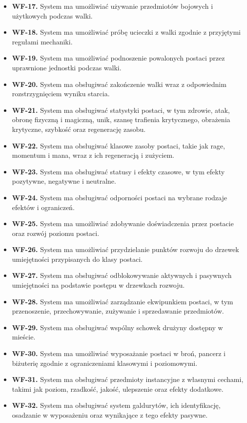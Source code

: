 \begin{itemize}
    \item \textbf{WF-17.} System ma umożliwiać używanie przedmiotów bojowych i użytkowych podczas walki.
    \item \textbf{WF-18.} System ma umożliwiać próbę ucieczki z walki zgodnie z przyjętymi regułami mechaniki.
    \item \textbf{WF-19.} System ma umożliwiać podnoszenie powalonych postaci przez uprawnione jednostki podczas walki.
    \item \textbf{WF-20.} System ma obsługiwać zakończenie walki wraz z odpowiednim rozstrzygnięciem wyniku starcia.
    \item \textbf{WF-21.} System ma obsługiwać statystyki postaci, w tym zdrowie, atak, obronę fizyczną i magiczną, unik, szansę trafienia krytycznego, obrażenia krytyczne, szybkość oraz regenerację zasobu.
    \item \textbf{WF-22.} System ma obsługiwać klasowe zasoby postaci, takie jak rage, momentum i mana, wraz z ich regeneracją i zużyciem.
    \item \textbf{WF-23.} System ma obsługiwać statusy i efekty czasowe, w tym efekty pozytywne, negatywne i neutralne.
    \item \textbf{WF-24.} System ma obsługiwać odporności postaci na wybrane rodzaje efektów i ograniczeń.
    \item \textbf{WF-25.} System ma umożliwiać zdobywanie doświadczenia przez postacie oraz rozwój poziomu postaci.
    \item \textbf{WF-26.} System ma umożliwiać przydzielanie punktów rozwoju do drzewek umiejętności przypisanych do klasy postaci.
    \item \textbf{WF-27.} System ma obsługiwać odblokowywanie aktywnych i pasywnych umiejętności na podstawie postępu w drzewkach rozwoju.
    \item \textbf{WF-28.} System ma umożliwiać zarządzanie ekwipunkiem postaci, w tym przenoszenie, przechowywanie, zużywanie i sprzedawanie przedmiotów.
    \item \textbf{WF-29.} System ma obsługiwać wspólny schowek drużyny dostępny w mieście.
    \item \textbf{WF-30.} System ma umożliwiać wyposażanie postaci w broń, pancerz i biżuterię zgodnie z ograniczeniami klasowymi i poziomowymi.
    \item \textbf{WF-31.} System ma obsługiwać przedmioty instancyjne z własnymi cechami, takimi jak poziom, rzadkość, jakość, ulepszenie oraz efekty dodatkowe.
    \item \textbf{WF-32.} System ma obsługiwać system galdurytów, ich identyfikację, osadzanie w wyposażeniu oraz wynikające z tego efekty pasywne.

\end{itemize}
